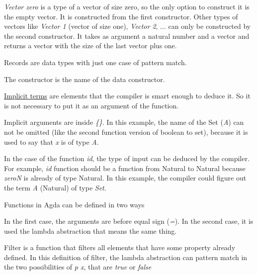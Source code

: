 
  \emph{Vector zero} is a type of a vector of size zero, so the only option to construct it is the empty vector.
  It is constructed from the first constructor.
  Other types of vectors like \emph{Vector 1} (vector of size one), \emph{Vector 2}, ... can only be constructed by
  the second constructor.
  It takes as argument a natural number and a vector and returns a vector with the size of the last vector
  plus one.

  Records are data types with just one case of pattern match.


  The constructor is the name of the data constructor.

  \hyperref[id]{Implicit terms} are elements that the compiler is smart enough to deduce it.
  So it is not necessary to put it as an argument of the function.


  Implicit arguments are inside \emph{\{\}}.
  In this example, the name of the Set (\emph{A}) can not be omitted
  (like the second function version of boolean to set),
  because it is used to say that \emph{x} is of type \emph{A}.

  In the case of the function \emph{id}, the type of input can be deduced by the compiler.
  For example, \emph{id} function should be a function from Natural to Natural because
  \emph{zeroN} is already of type Natural.
  In this example, the compiler could figure out the term \emph{A} (Natural) of type \emph{Set}.


  Functions in Agda can be defined in two ways


  In the first case, the arguments are before equal sign (\emph{=}).
  In the second case, it is used the lambda abstraction that means the same thing.



  Filter is a function that filters all elements that have some property already defined.
  In this definition of filter, the lambda abstraction can pattern match
  in the two possibilities of \emph{p x}, that are \emph{true} or \emph{false}


